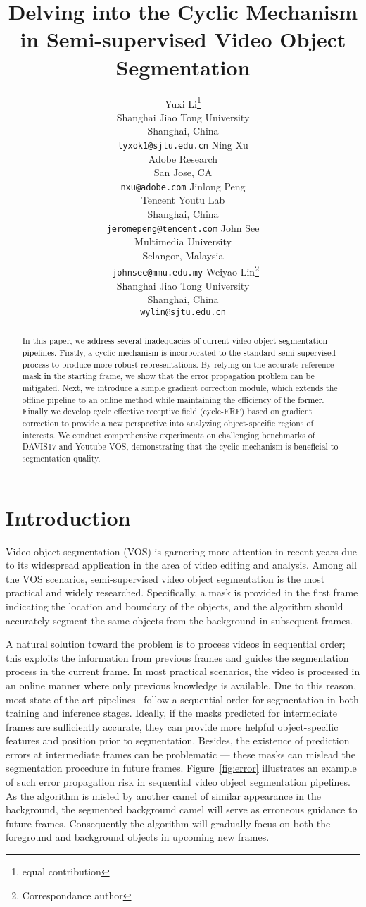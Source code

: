 \documentclass{article}
\title{Delving into the Cyclic Mechanism in Semi-supervised Video Object Segmentation}
\author{Yuxi Li\thanks{equal contribution} \\
  Shanghai Jiao Tong University\\
  Shanghai, China \\
  \texttt{lyxok1@sjtu.edu.cn}
  \And
  Ning Xu\footnotemark[1] \\
  Adobe Research\\
  San Jose, CA \\
  \texttt{nxu@adobe.com} 
  \And
  Jinlong Peng\footnotemark[1] \\
  Tencent Youtu Lab \\
  Shanghai, China \\
  \texttt{jeromepeng@tencent.com}
  \And
  John See \\
  Multimedia University\\
  Selangor, Malaysia \\
  \texttt{ johnsee@mmu.edu.my}
  \And
  Weiyao Lin\thanks{Correspondance author} \\
  Shanghai Jiao Tong University\\
  Shanghai, China \\
  \texttt{wylin@sjtu.edu.cn} 
}
\newcommand{\js}[1]{\textcolor{black}{{#1}}}
\begin{document}
\maketitle

\begin{abstract}
  In this paper, we 
  \js{address several inadequacies of current video object segmentation pipelines. Firstly, a cyclic mechanism is incorporated to the standard semi-supervised process \js{to produce more robust representations}.}
By \js{relying} on the accurate reference mask \js{in the starting} frame, we \js{show} that the error propagation problem can be mitigated.
Next, we introduce a simple gradient correction module, which extends the offline pipeline to an online method while \js{maintaining} the efficiency of the \js{former}. Finally we develop cycle effective receptive field (cycle-ERF) based on gradient correction to provide a new perspective \js{into} analyzing object-specific regions of interests. We conduct comprehensive experiments on challenging benchmarks of DAVIS17 and Youtube-VOS, demonstrating that the cyclic mechanism is \js{beneficial to} segmentation quality.
\end{abstract}

\section{Introduction}
Video object segmentation (VOS) is garnering more attention in recent years due to its widespread application in the area of video editing and analysis. Among all the VOS scenarios, semi-supervised video object segmentation is the most practical and widely researched. Specifically, a mask is provided in the first frame indicating the location and boundary of the objects, and the algorithm should accurately segment the same objects from the background in subsequent frames.

A natural solution toward the problem is to process videos in sequential order; this exploits the information from previous frames and guides the segmentation process in the current frame. In most practical scenarios, the video is processed in an online manner where only previous knowledge is available. Due to this reason, most state-of-the-art pipelines~\cite{Oh_2018_CVPR,Cae_OVOS_17,Lin_2019_ICCV,luiten2018premvos,Oh_2019_ICCV,Perazzi_2017_CVPR,Voigtlaender_2019_CVPR,Zeng_2019_ICCV,voigtlaender17BMVC} follow a sequential order for segmentation in both training and inference stages. Ideally, if the masks predicted for intermediate frames are sufficiently accurate, they can provide more helpful object-specific features and position prior to segmentation. Besides, the existence of prediction errors at intermediate frames can be problematic --- these masks can mislead the segmentation procedure in future frames. Figure~\ref{fig:error} illustrates an example of such error propagation risk in sequential video object segmentation pipelines. As the algorithm is misled by another camel of similar appearance in the background, the segmented background camel will serve as erroneous guidance to future frames. Consequently the algorithm will gradually focus on both the foreground and background objects in upcoming new frames.
\end{document}
